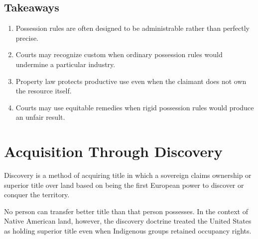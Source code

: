 \documentclass[11pt]{tex/lawoutline}
\begin{document}
\subsection{Takeaways}{
\begin{enumerate}
    \item Possession rules are often designed to be administrable rather than perfectly precise.
    \item Courts may recognize custom when ordinary possession rules would undermine a particular industry.
    \item Property law protects productive use even when the claimant does not own the resource itself.
    \item Courts may use equitable remedies when rigid possession rules would produce an unfair result.
\end{enumerate}
}


\section{Acquisition Through Discovery}

{
Discovery is a method of acquiring title in which a sovereign claims ownership or superior title over land based on being the first European power to discover or conquer the territory.
}


{
No person can transfer better title than that person possesses. In the context of Native American land, however, the discovery doctrine treated the United States as holding superior title even when Indigenous groups retained occupancy rights.
}
\end{document}
